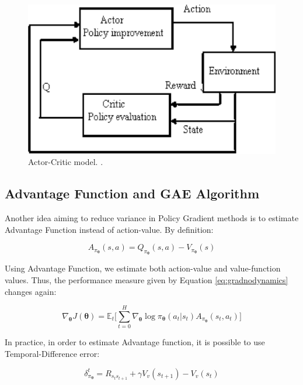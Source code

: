\begin{figure}[!htpb]
	\centering
	\includegraphics[scale=0.5]{Cap4/actorcritic.eps}
	\caption{Actor-Critic model. \cite{actorcritic}.}
	\label{fig:actorcritic}
\end{figure}

\subsection{Advantage Function and GAE Algorithm} \label{sec:gae}

Another idea aiming to reduce variance in Policy Gradient methods is to estimate Advantage Function instead of action-value. By definition:

\begin{equation}
A_{\pi_{\boldsymbol{\theta}}}(s,a) =Q_{\pi_{\boldsymbol{\theta}}}(s,a) - V_{\pi_{\boldsymbol{\theta}}}(s)
\end{equation}

Using Advantage Function, we estimate both action-value and value-function values. Thus, the performance measure given by Equation \ref{eq:gradnodynamics} changes again:

\begin{equation}\label{eq:advgradient}
\nabla_{\boldsymbol{\theta}} J(\boldsymbol{\theta}) = \mathbb{E}_{t} \Bigg[ \sum_{t=0}^{H} \nabla_{\boldsymbol{\theta}} \log \pi_{\boldsymbol{\theta}} (a_{t}|s_{t}) A_{\pi_{\boldsymbol{\theta}}}(s_{t},a_{t}) \Bigg]
\end{equation}

In practice, in order to estimate Advantage function, it is possible to use Temporal-Difference error:

\begin{equation}
\delta^{t}_{\pi_{\boldsymbol{\theta}}} = R_{s_{t}s_{t+1}} + \gamma V_v(s_{t+1}) - V_v(s_{t}) \label{eq:tderror}
\end{equation}

